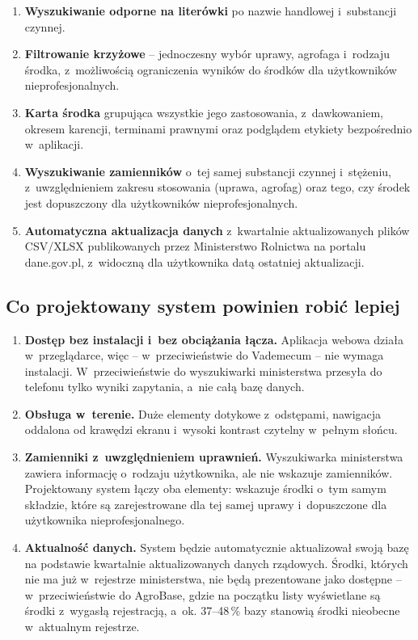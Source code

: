 \begin{enumerate}
    \item \textbf{Wyszukiwanie odporne na literówki} po nazwie handlowej
    i~substancji czynnej.

    \item \textbf{Filtrowanie krzyżowe} -- jednoczesny wybór uprawy,
    agrofaga i~rodzaju środka, z~możliwością ograniczenia wyników do środków
    dla użytkowników nieprofesjonalnych.

    \item \textbf{Karta środka} grupująca wszystkie jego zastosowania,
    z~dawkowaniem, okresem karencji, terminami prawnymi oraz podglądem
    etykiety bezpośrednio w~aplikacji.

    \item \textbf{Wyszukiwanie zamienników} o~tej samej substancji czynnej
    i~stężeniu, z~uwzględnieniem zakresu stosowania (uprawa, agrofag) oraz
    tego, czy środek jest dopuszczony dla użytkowników nieprofesjonalnych.

    \item \textbf{Automatyczna aktualizacja danych} z~kwartalnie
    aktualizowanych plików CSV/XLSX publikowanych przez Ministerstwo
    Rolnictwa na portalu dane.gov.pl, z~widoczną dla użytkownika datą
    ostatniej aktualizacji.
\end{enumerate}

\subsection{Co projektowany system powinien robić lepiej}

\begin{enumerate}
    \item \textbf{Dostęp bez instalacji i~bez obciążania łącza.}
    Aplikacja webowa działa w~przeglądarce, więc -- w~przeciwieństwie do
    Vademecum -- nie wymaga instalacji. W~przeciwieństwie do
    wyszukiwarki ministerstwa przesyła do telefonu tylko wyniki zapytania,
    a~nie całą bazę danych.

    \item \textbf{Obsługa w~terenie.} Duże elementy dotykowe z~odstępami,
    nawigacja oddalona od krawędzi ekranu i~wysoki kontrast czytelny
    w~pełnym słońcu.

    \item \textbf{Zamienniki z~uwzględnieniem uprawnień.} Wyszukiwarka
    ministerstwa zawiera informację o~rodzaju użytkownika, ale nie wskazuje
    zamienników. Projektowany system łączy oba elementy: wskazuje środki
    o~tym samym składzie, które są zarejestrowane dla tej samej uprawy
    i~dopuszczone dla użytkownika nieprofesjonalnego.

    \item \textbf{Aktualność danych.} System będzie automatycznie
    aktualizował swoją bazę na podstawie kwartalnie aktualizowanych danych
    rządowych. Środki, których nie ma już w~rejestrze ministerstwa, nie
    będą prezentowane jako dostępne -- w~przeciwieństwie do AgroBase, gdzie
    na początku listy wyświetlane są środki z~wygasłą rejestracją, a~ok.
    37--48\,\% bazy stanowią środki nieobecne w~aktualnym rejestrze.
\end{enumerate}
